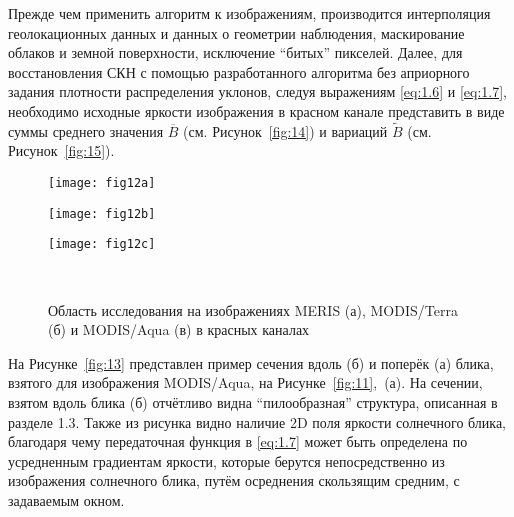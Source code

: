 Прежде чем применить алгоритм к изображениям, производится интерполяция геолокационных данных и данных о геометрии наблюдения, маскирование облаков и земной поверхности, исключение ``битых'' пикселей. Далее, для восстановления СКН с помощью разработанного алгоритма без априорного задания плотности распределения уклонов, следуя выражениям \eqref{eq:1.6} и \eqref{eq:1.7}, необходимо исходные яркости изображения в красном канале представить в виде суммы среднего значения $\overline{B}$ (см. Рисунок~\ref{fig:14}) и вариаций $\widetilde{B}$ (см. Рисунок~\ref{fig:15}).



\begin{figure}[H]
    	\centering
	\begin{minipage}{.31\textwidth}
	    \subcaptionbox{\label{fig:12a}}
		{\texttt{[image: fig12a]}}
	\end{minipage}
	\hfill
	\begin{minipage}{.31\textwidth}
	    \subcaptionbox{\label{fig:12b}}
		{\texttt{[image: fig12b]}}
	\end{minipage}
	\hfill
	\begin{minipage}{.31\textwidth}
	    \subcaptionbox{\label{fig:12c}}
		{\texttt{[image: fig12c]}}
	\end{minipage}
	\\
    \caption{Область исследования на изображениях MERIS (а), MODIS/Terra (б) и MODIS/Aqua (в) в красных каналах}
    \label{fig:12}
\end{figure}

На Рисунке~\ref{fig:13} представлен пример сечения вдоль (б) и поперёк (а) блика, взятого для изображения MODIS/Aqua, на Рисунке~\ref{fig:11},~(а). На сечении, взятом вдоль блика (б) отчётливо видна ``пилообразная'' структура, описанная в разделе 1.3. Также из рисунка видно наличие 2D поля яркости солнечного блика, благодаря чему передаточная функция в \eqref{eq:1.7} может быть определена по усредненным градиентам яркости, которые берутся непосредственно из изображения солнечного блика, путём осреднения скользящим средним, с задаваемым окном.



